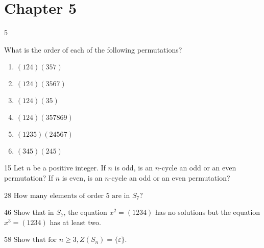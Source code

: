 \section*{Chapter 5}

\begin{hwproblem}
{5}{
    What is the order of each of the following permutations?
    \begin{enumerate}[label=\alph*.]
        \item $(124)(357)$
        \item $(124)(3567)$
        \item $(124)(35)$
        \item $(124)(357869)$
        \item $(1235)(24567)$
        \item $(345)(245)$
    \end{enumerate}
}
\end{hwproblem}

\begin{hwproblem}
{15}{
    Let $n$ be a positive integer. If $n$ is odd, is an $n$-cycle an odd or an even permutation? If $n$ is even, is an $n$-cycle an odd or an even permutation?
}
\end{hwproblem}

\begin{hwproblem}
{28}{
    $\text{How many elements of order } 5 \text { are in } S_7 \text {?}$
}
\end{hwproblem}

\begin{hwproblem}
{46}{
    Show that in $S_7$, the equation $x^2=(1234)$ has no solutions but the equation $x^3=(1234)$ has at least two.
}
\end{hwproblem}

\begin{hwproblem}
{58}{
    $\text{Show that for } n \geq 3, Z\left(S_n\right)=\{\varepsilon\} \text{.}$
}
\end{hwproblem}
